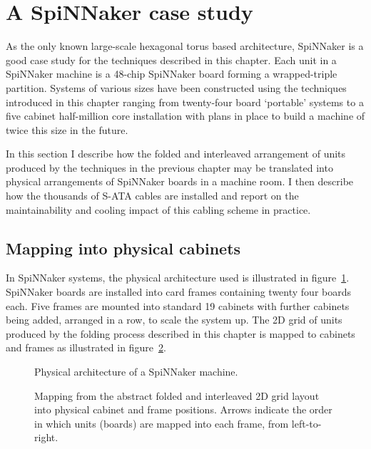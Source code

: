 	\section{A SpiNNaker case study}
		
		As the only known large-scale hexagonal torus based architecture, SpiNNaker
		is a good case study for the techniques described in this chapter.  Each
		unit in a SpiNNaker machine is a 48-chip SpiNNaker board forming a
		wrapped-triple partition. Systems of various sizes have been constructed
		using the techniques introduced in this chapter ranging from twenty-four
		board `portable' systems to a five cabinet half-million core installation
		with plans in place to build a machine of twice this size in the future.
		
		In this section I describe how the folded and interleaved arrangement of
		units produced by the techniques in the previous chapter may be translated
		into physical arrangements of SpiNNaker boards in a machine room. I then
		describe how the thousands of S-ATA cables are installed and report on the
		maintainability and cooling impact of this cabling scheme in practice.
		
		\subsection{Mapping into physical cabinets}
			
			In SpiNNaker systems, the physical architecture used is illustrated in
			figure~\ref{fig:cabinet-units}. SpiNNaker boards are installed into card
			frames containing twenty four boards each. Five frames are mounted into
			standard 19\inch{} cabinets with further cabinets being added, arranged
			in a row, to scale the system up. The 2D grid of units produced by the
			folding process described in this chapter is mapped to cabinets and
			frames as illustrated in figure~\ref{fig:cabinetisation}.
			
			\begin{figure}
				\center
				
				\caption{Physical architecture of a SpiNNaker machine.}
				\label{fig:cabinet-units}
			\end{figure}
			
			\begin{figure}
				\center
				
				\caption[Mapping cabling from abstract to physical space.]%
				{Mapping from the abstract folded and interleaved 2D grid
				layout into physical cabinet and frame positions. Arrows indicate the
				order in which units (boards) are mapped into each frame, from
				left-to-right.}
				\label{fig:cabinetisation}
			\end{figure}
			
